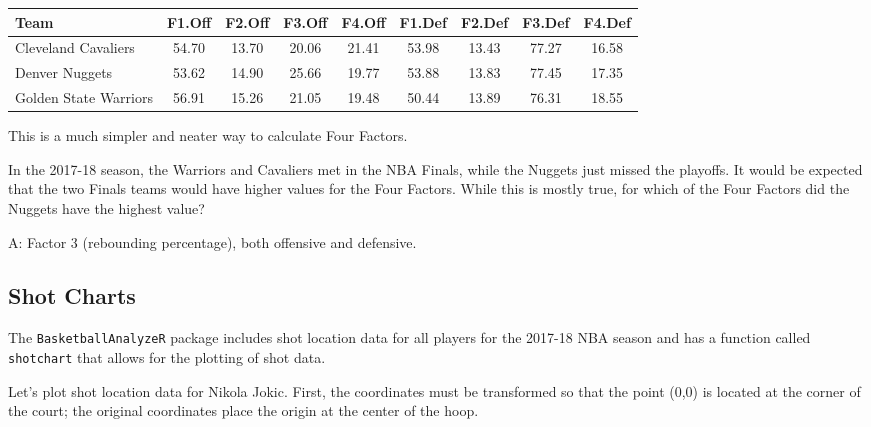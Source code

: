 \documentclass[
  11pt,
]{book}
\newenvironment{Shaded}{\begin{snugshade}}{\end{snugshade}}
\newcommand{\CommentTok}[1]{\textcolor[rgb]{0.56,0.35,0.01}{\textit{#1}}}
\newcommand{\DecValTok}[1]{\textcolor[rgb]{0.00,0.00,0.81}{#1}}
\newcommand{\FloatTok}[1]{\textcolor[rgb]{0.00,0.00,0.81}{#1}}
\newcommand{\FunctionTok}[1]{\textcolor[rgb]{0.00,0.00,0.00}{#1}}
\newcommand{\NormalTok}[1]{#1}
\newcommand{\OtherTok}[1]{\textcolor[rgb]{0.56,0.35,0.01}{#1}}
\newcommand{\SpecialCharTok}[1]{\textcolor[rgb]{0.00,0.00,0.00}{#1}}
\newcommand{\StringTok}[1]{\textcolor[rgb]{0.31,0.60,0.02}{#1}}
\theoremstyle{definition}
\theoremstyle{definition}
\theoremstyle{definition}
\theoremstyle{definition}
\theoremstyle{remark}
\begin{document}
\begin{table}[H]
\centering
\begin{tabular}{l|c|c|c|c|c|c|c|c}
\hline
Team & F1.Off & F2.Off & F3.Off & F4.Off & F1.Def & F2.Def & F3.Def & F4.Def\\
\hline
Cleveland Cavaliers & 54.70 & 13.70 & 20.06 & 21.41 & 53.98 & 13.43 & 77.27 & 16.58\\
\hline
Denver Nuggets & 53.62 & 14.90 & 25.66 & 19.77 & 53.88 & 13.83 & 77.45 & 17.35\\
\hline
Golden State Warriors & 56.91 & 15.26 & 21.05 & 19.48 & 50.44 & 13.89 & 76.31 & 18.55\\
\hline
\end{tabular}
\end{table}

This is a much simpler and neater way to calculate Four Factors.

In the 2017-18 season, the Warriors and Cavaliers met in the NBA Finals, while the Nuggets just missed the playoffs. It would be expected that the two Finals teams would have higher values for the Four Factors. While this is mostly true, for which of the Four Factors did the Nuggets have the highest value?

A: Factor 3 (rebounding percentage), both offensive and defensive.

\hypertarget{shot-charts}{%
\subsection{Shot Charts}\label{shot-charts}}

The \texttt{BasketballAnalyzeR} package includes shot location data for all players for the 2017-18 NBA season and has a function called \texttt{shotchart} that allows for the plotting of shot data.

Let's plot shot location data for Nikola Jokic. First, the coordinates must be transformed so that the point (0,0) is located at the corner of the court; the original coordinates place the origin at the center of the hoop.

\begin{Shaded}
\end{Shaded}
\end{document}
